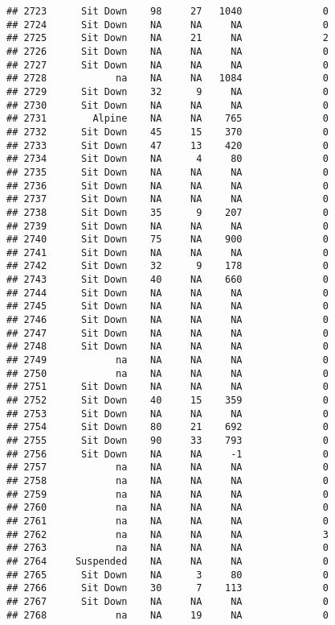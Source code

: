 \documentclass[
]{article}
\begin{document}
\begin{verbatim}
## 2723      Sit Down    98     27   1040              0
## 2724      Sit Down    NA     NA     NA              0
## 2725      Sit Down    NA     21     NA              2
## 2726      Sit Down    NA     NA     NA              0
## 2727      Sit Down    NA     NA     NA              0
## 2728            na    NA     NA   1084              0
## 2729      Sit Down    32      9     NA              0
## 2730      Sit Down    NA     NA     NA              0
## 2731        Alpine    NA     NA    765              0
## 2732      Sit Down    45     15    370              0
## 2733      Sit Down    47     13    420              0
## 2734      Sit Down    NA      4     80              0
## 2735      Sit Down    NA     NA     NA              0
## 2736      Sit Down    NA     NA     NA              0
## 2737      Sit Down    NA     NA     NA              0
## 2738      Sit Down    35      9    207              0
## 2739      Sit Down    NA     NA     NA              0
## 2740      Sit Down    75     NA    900              0
## 2741      Sit Down    NA     NA     NA              0
## 2742      Sit Down    32      9    178              0
## 2743      Sit Down    40     NA    660              0
## 2744      Sit Down    NA     NA     NA              0
## 2745      Sit Down    NA     NA     NA              0
## 2746      Sit Down    NA     NA     NA              0
## 2747      Sit Down    NA     NA     NA              0
## 2748      Sit Down    NA     NA     NA              0
## 2749            na    NA     NA     NA              0
## 2750            na    NA     NA     NA              0
## 2751      Sit Down    NA     NA     NA              0
## 2752      Sit Down    40     15    359              0
## 2753      Sit Down    NA     NA     NA              0
## 2754      Sit Down    80     21    692              0
## 2755      Sit Down    90     33    793              0
## 2756      Sit Down    NA     NA     -1              0
## 2757            na    NA     NA     NA              0
## 2758            na    NA     NA     NA              0
## 2759            na    NA     NA     NA              0
## 2760            na    NA     NA     NA              0
## 2761            na    NA     NA     NA              0
## 2762            na    NA     NA     NA              3
## 2763            na    NA     NA     NA              0
## 2764     Suspended    NA     NA     NA              0
## 2765      Sit Down    NA      3     80              0
## 2766      Sit Down    30      7    113              0
## 2767      Sit Down    NA     NA     NA              0
## 2768            na    NA     19     NA              0

\end{verbatim}
\end{document}
